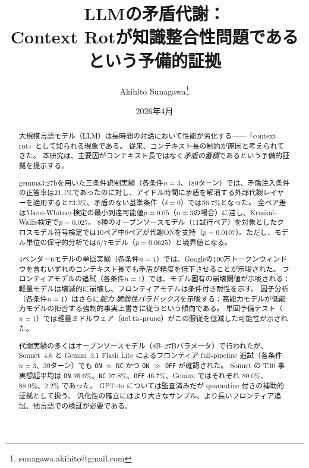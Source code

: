 \documentclass[11pt,a4paper]{article}
\title{\textbf{LLMの矛盾代謝：\\Context Rotが知識整合性問題であるという予備的証拠}}
\author{Akihito Sunagawa\thanks{sunagawa.akihito@gmail.com}}
\date{2026年4月}
\begin{document}
\maketitle

\begin{abstract}
大規模言語モデル（LLM）は長時間の対話において性能が劣化する——「context rot」として知られる現象である。
従来、コンテキスト長の制約が原因と考えられてきた。
本研究は、主要因がコンテキスト長ではなく\emph{矛盾の蓄積}であるという予備的証拠を提示する。

gemma3:27bを用いた三条件統制実験（各条件$n = 3$、180ターン）では、矛盾注入条件の正答率は21.1\%であったのに対し、アイドル時間に矛盾を解消する外部代謝レイヤーを適用すると73.3\%、矛盾のない基準条件（$\delta = 0$）では56.7\%となった。
全ペア差はMann-Whitney検定の最小到達可能値$p = 0.05$（$n = 3$の場合）に達し、Kruskal-Wallis検定で$p = 0.027$。
8種のオープンソースモデル（11試行ペア）を対象としたクロスモデル符号検定では10ペア中9ペアが代謝ONを支持（$p = 0.0107$）。ただし、モデル単位の保守的分析では6/7モデル（$p = 0.0625$）と境界値となる。

4ベンダー6モデルの単回実験（各条件$n = 1$）では、Googleの100万トークンウィンドウを含むいずれのコンテキスト長でも矛盾が精度を低下させることが示唆された。
フロンティアモデルの追試（各条件$n = 1$）では、モデル固有の崩壊閾値が示唆される：軽量モデルは壊滅的に崩壊し、フロンティアモデルは条件付き耐性を示す。
因子分析（各条件$n = 1$）はさらに\emph{能力-脆弱性パラドックス}を示唆する：高能力モデルが低能力モデルの拒否する強制的事実上書きに従うという傾向である。
単回予備テスト（$n = 1$）では軽量ミドルウェア（\texttt{delta-prune}）がこの服従を低減した可能性が示された。

代謝実験の多くはオープンソースモデル（8B--27Bパラメータ）で行われたが、Sonnet~4.6 と Gemini~3.1 Flash Lite によるフロンティア full-pipeline 追試（各条件$n = 3$、30ターン）でも \texttt{ON} $\approx$ \texttt{NC} かつ \texttt{ON} $\gg$ \texttt{OFF} が確認された。
Sonnet の T30 事実想起平均は \texttt{ON} 95.6\%、\texttt{NC} 97.8\%、\texttt{OFF} 46.7\%、Gemini ではそれぞれ 80.0\%、88.9\%、2.2\% であった。
GPT-4o については監査済みだが quarantine 付きの補助的証拠として扱う。
汎化性の確立にはより大きなサンプル、より長いフロンティア追試、他言語での検証が必要である。
\end{abstract}

\end{document}
